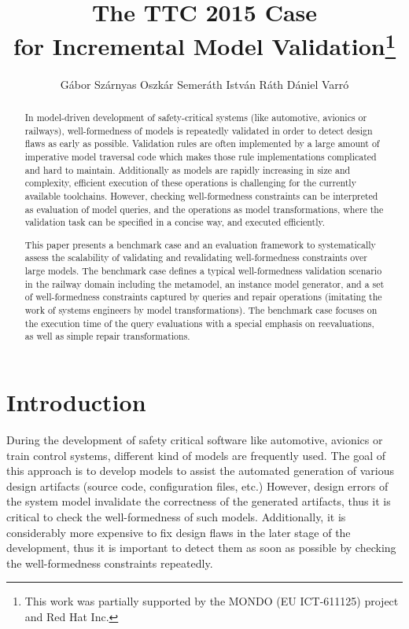 \documentclass[submission,copyright,creativecommons]{eptcs}
\title{The TTC 2015 \tb Case\\ for Incremental Model Validation\thanks{This work was partially supported by the MONDO (EU ICT-611125) project and Red Hat Inc.}}
\author{G\'{a}bor Sz\'{a}rnyas \qquad Oszk\'{a}r Semer\'{a}th \qquad Istv\'{a}n R\'{a}th \qquad D\'{a}niel Varr\'{o}
\institute{Budapest University of Technology and Economics\\
Department of Measurement and Information Systems\\
H-1117 Magyar tud\'{o}sok krt. 2, Budapest, Hungary}
\email{\{szarnyas, semerath, rath, varro\}@mit.bme.hu}
}
\begin{document}
\maketitle

\begin{abstract}
In model-driven development of safety-critical systems (like automotive, avionics or railways), well-formedness of models is repeatedly validated in order to detect design flaws as early as possible. Validation rules are often implemented by a large amount of imperative model traversal code which makes those rule implementations complicated and hard to maintain. Additionally as models are rapidly increasing in size and complexity, efficient execution of these operations is challenging for the currently available toolchains. However, checking well-formedness constraints can be interpreted as evaluation of model queries, and the operations as model transformations, where the validation task can be specified in a concise way, and executed efficiently.

This paper presents a benchmark case and an evaluation framework to systematically assess the scalability of validating and revalidating well-formedness constraints over large models. The benchmark case defines a typical well-formedness validation scenario in the railway domain including the metamodel, an instance model generator, and a set of well-formedness constraints captured by queries and repair operations (imitating the work of systems engineers by model transformations). The benchmark case focuses on the execution time of the query evaluations with a special emphasis on reevaluations, as well as simple repair transformations.
\end{abstract}

\section{Introduction}

During the development of safety critical software like automotive, avionics or train control systems, different kind of models are frequently used. The goal of this approach is to develop models to assist the automated generation of various design artifacts (source code, configuration files, etc.) However, design errors of the system model invalidate the correctness of the generated artifacts, thus it is critical to check the well-formedness of such models. Additionally, it is considerably more expensive to fix design flaws in the later stage of the development, thus it is important to detect them as soon as possible by checking the well-formedness constraints repeatedly.
\end{document}
